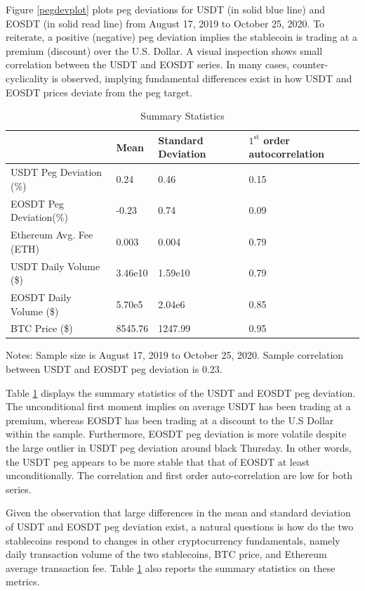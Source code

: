 \documentclass[12pt]{article}
\begin{document}
Figure \ref{pegdevplot} plots peg deviations for USDT (in solid blue line) and EOSDT (in solid read line) from August 17, 2019 to October 25, 2020. To reiterate, a positive (negative) peg deviation implies the stablecoin is trading at a premium (discount) over the U.S. Dollar. A visual inspection shows small correlation between the USDT and EOSDT series. In many cases, counter-cyclicality is observed, implying fundamental differences exist in how USDT and EOSDT prices deviate from the peg target. 


\begin{table}
		\caption {Summary Statistics}\label{tablestats}
		\begin{tabular}{ |p{5cm}||p{3cm}|p{3cm}|p{3cm}|  }
			\hline
			& Mean & Standard Deviation & $1^{\text{st}}$ order autocorrelation\\
			\hline
			USDT Peg Deviation (\%) &  0.24    & 0.46 &  0.15\\
			EOSDT Peg Deviation(\%) & -0.23    & 0.74 &  0.09\\
			Ethereum Avg. Fee (ETH)  &  0.003    & 0.004 &  0.79\\
			USDT Daily Volume (\$)  &  3.46e10   & 1.59e10 &  0.79\\
			EOSDT Daily Volume (\$)	&  5.70e5   & 2.04e6 &  0.85\\
			BTC Price (\$)     		&  8545.76    & 1247.99 &  0.95\\
			\hline
		\end{tabular}

{\raggedright \small Notes: Sample size is August 17, 2019 to October 25, 2020. Sample correlation between USDT and EOSDT peg deviation is 0.23. \par}	
\end{table}



Table \ref{tablestats} displays the summary statistics of the USDT and EOSDT peg deviation. The unconditional first moment implies on average USDT has been trading at a premium, whereas EOSDT has been trading at a discount to the U.S Dollar within the sample. Furthermore, EOSDT peg deviation is more volatile despite the large outlier in USDT peg deviation around black Thursday. In other words, the USDT peg appears to be more stable that that of EOSDT at least unconditionally. The correlation and first order auto-correlation are low for both series. 

Given the observation that large differences in the mean and standard deviation of USDT and EOSDT peg deviation exist, a natural questions is how do the two stablecoins respond to changes in other cryptocurrency fundamentals, namely daily transaction volume of the two stablecoins, BTC price, and Ethereum average transaction fee. Table \ref{tablestats} also reports the summary statistics on these metrics. 
\end{document}
